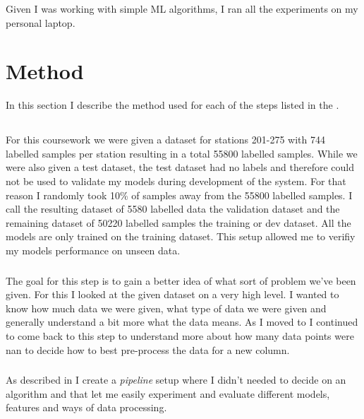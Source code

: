 \documentclass[a4paper]{article}
\begin{document}
    Given I was working with simple ML algorithms, I ran all the experiments on my personal laptop.


    \section{Method}\label{sec:method}

    In this section I describe the method used for each of the steps listed in the .

    \subsection*{}

    For this coursework we were given a dataset for stations 201-275 with 744 labelled samples per station
    resulting in a total 55800 labelled samples. While we were also given a test dataset, the test dataset had no labels
    and therefore could not be used to validate my models during development of the system. For that reason I randomly
    took 10\% of samples away from the 55800 labelled samples. I call the resulting dataset of 5580 labelled data the validation
    dataset and the remaining dataset of 50220 labelled samples the training or dev dataset. All the models are only
    trained on the training dataset. This setup allowed me to verifiy my models performance on unseen data.

    \subsubsection*{}
    The goal for this step is to gain a better idea of what sort of problem we've been given. For this I looked at the
    given dataset on a very high level. I wanted to know how much data we were given, what type of data we were given and
    generally understand
    a bit more what the data means. As I moved to  I continued to come back to this step
    to understand more about how many data points were nan to decide how to best pre-process the data for a new column.


    \subsubsection*{}
    As described in  I create a \textit{pipeline} setup where I didn't needed to decide
    on an algorithm and that let me easily experiment and evaluate different models, features and ways of data processing.
\end{document}

